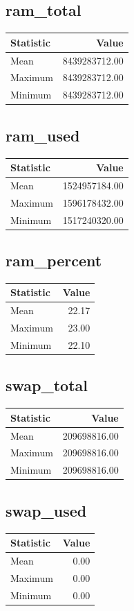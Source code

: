 \documentclass[11pt]{article}
\begin{document}
\subsection{ram_total}
\begin{tabular}{lr}
\toprule
Statistic & Value \\
\midrule
Mean & 8439283712.00 \\
Maximum & 8439283712.00 \\
Minimum & 8439283712.00 \\
\bottomrule
\end{tabular}


\subsection{ram_used}
\begin{tabular}{lr}
\toprule
Statistic & Value \\
\midrule
Mean & 1524957184.00 \\
Maximum & 1596178432.00 \\
Minimum & 1517240320.00 \\
\bottomrule
\end{tabular}


\subsection{ram_percent}
\begin{tabular}{lr}
\toprule
Statistic & Value \\
\midrule
Mean & 22.17 \\
Maximum & 23.00 \\
Minimum & 22.10 \\
\bottomrule
\end{tabular}


\subsection{swap_total}
\begin{tabular}{lr}
\toprule
Statistic & Value \\
\midrule
Mean & 209698816.00 \\
Maximum & 209698816.00 \\
Minimum & 209698816.00 \\
\bottomrule
\end{tabular}


\subsection{swap_used}
\begin{tabular}{lr}
\toprule
Statistic & Value \\
\midrule
Mean & 0.00 \\
Maximum & 0.00 \\
Minimum & 0.00 \\
\bottomrule
\end{tabular}
\end{document}
